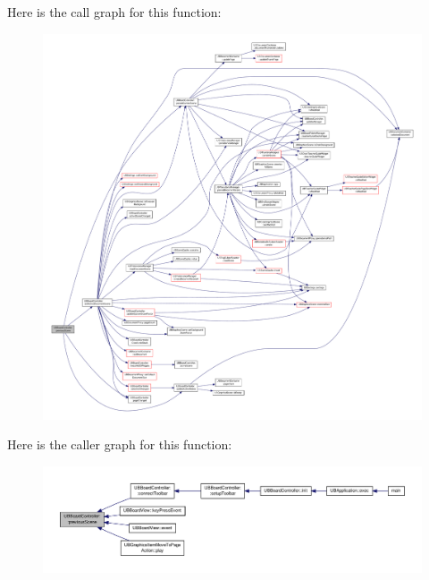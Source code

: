 Here is the call graph for this function\-:
\nopagebreak
\begin{figure}[H]
\begin{center}
\leavevmode
\includegraphics[width=350pt]{d7/d62/class_u_b_board_controller_aeef919027b89d95c392a7e0fe5a6444d_cgraph}
\end{center}
\end{figure}




Here is the caller graph for this function\-:
\nopagebreak
\begin{figure}[H]
\begin{center}
\leavevmode
\includegraphics[width=350pt]{d7/d62/class_u_b_board_controller_aeef919027b89d95c392a7e0fe5a6444d_icgraph}
\end{center}
\end{figure}


